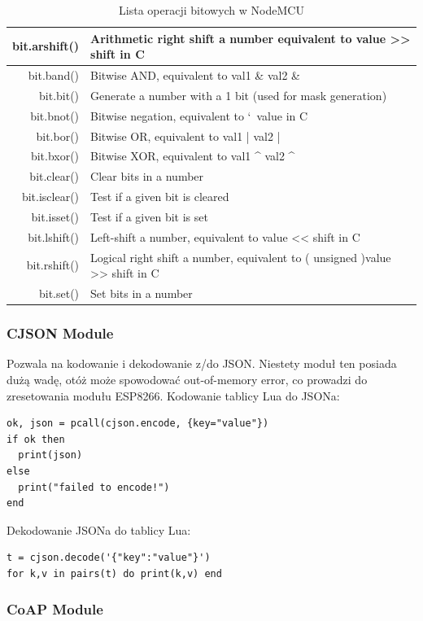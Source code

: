 \begin{table}[t]
\caption{Lista operacji bitowych w NodeMCU}
\label{fig:bit-module}
\begin{tabular}{|r|l|}
  \hline 
  bit.arshift() & Arithmetic right shift a number equivalent to value >> shift in C\\
  \hline 
  bit.band()  & Bitwise AND, equivalent to val1 \& val2 \& \\
  \hline 
  bit.bit() & Generate a number with a 1 bit (used for mask generation)\\
  \hline 
  bit.bnot() & Bitwise negation, equivalent to `~value in C\\
  \hline 
  bit.bor() & Bitwise OR, equivalent to val1 | val2 | \\
  \hline 
  bit.bxor() & Bitwise XOR, equivalent to val1 ^ val2 ^ \\
  \hline 
  bit.clear() & Clear bits in a number\\
  \hline 
  bit.isclear() & Test if a given bit is cleared\\
  \hline 
  bit.isset() & Test if a given bit is set\\
  \hline 
  bit.lshift() & Left-shift a number, equivalent to value << shift in C\\
  \hline 
  bit.rshift() & Logical right shift a number, equivalent to ( unsigned )value >> shift in C\\
  \hline 
  bit.set() & Set bits in a number\\
  \hline
\end{tabular} 
\end{table}

\subsubsection{CJSON Module}
Pozwala na kodowanie i dekodowanie z/do JSON. Niestety moduł ten posiada dużą wadę, otóż może spowodować out-of-memory error, co prowadzi do zresetowania modułu ESP8266. 
Kodowanie tablicy Lua do JSONa:
\begin{lstlisting}
ok, json = pcall(cjson.encode, {key="value"})
if ok then
  print(json)
else
  print("failed to encode!")
end
\end{lstlisting} 
Dekodowanie JSONa do tablicy Lua:
\begin{lstlisting}
t = cjson.decode('{"key":"value"}')
for k,v in pairs(t) do print(k,v) end
\end{lstlisting} 

\subsubsection{CoAP Module}


